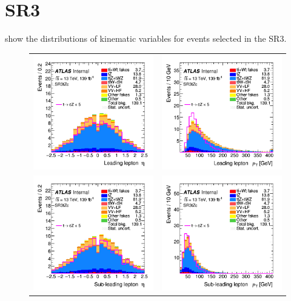 \clearpage
\FloatBarrier
\newpage
\section{SR3\tZc}
\label{app:SRs:SR3}
 show the distributions 
of kinematic variables for events selected in the SR3\tZc.

\begin{figure}[!htbp]
	\centering
	\begin{tabular}{cc}
		\includegraphics[width=.35\textwidth]{Appendices/AP6/figures/SR3_UsingDL1rc/lep1_eta} &
		\includegraphics[width=.35\textwidth]{Appendices/AP6/figures/SR3_UsingDL1rc/lep1_pt} \\
		\includegraphics[width=.35\textwidth]{Appendices/AP6/figures/SR3_UsingDL1rc/lep2_eta} &
		\includegraphics[width=.35\textwidth]{Appendices/AP6/figures/SR3_UsingDL1rc/lep2_pt} \\

\end{tabular}
\end{figure}
